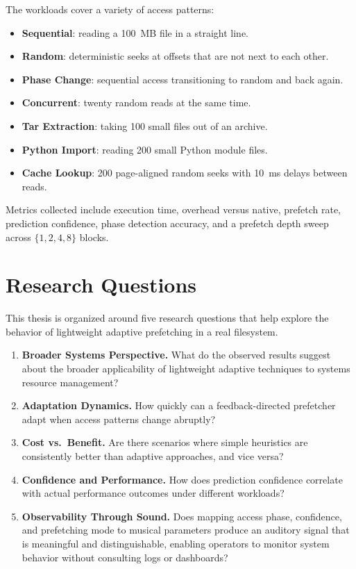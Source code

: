\documentclass[12pt]{report}
\begin{document}
The workloads cover a variety of access patterns:

\begin{itemize}
    \item \textbf{Sequential}: reading a 100~MB file in a straight line.
    \item \textbf{Random}: deterministic seeks at offsets that are not next
    to each other.
    \item \textbf{Phase Change}: sequential access transitioning to random
    and back again.
    \item \textbf{Concurrent}: twenty random reads at the same time.
    \item \textbf{Tar Extraction}: taking 100 small files out of an archive.
    \item \textbf{Python Import}: reading 200 small Python module files.
    \item \textbf{Cache Lookup}: 200 page-aligned random seeks with 10~ms
    delays between reads.
\end{itemize}

Metrics collected include execution time, overhead versus native, prefetch
rate, prediction confidence, phase detection accuracy, and a prefetch depth
sweep across $\{1, 2, 4, 8\}$ blocks.

\section{Research Questions}

This thesis is organized around five research questions that help explore
the behavior of lightweight adaptive prefetching in a real filesystem.

\begin{enumerate}

    \item \textbf{Broader Systems Perspective.} What do the observed results
    suggest about the broader applicability of lightweight adaptive techniques
    to systems resource management?

    \item \textbf{Adaptation Dynamics.} How quickly can a feedback-directed
    prefetcher adapt when access patterns change abruptly?

    \item \textbf{Cost vs.\ Benefit.} Are there scenarios where simple
    heuristics are consistently better than adaptive approaches, and vice
    versa?

    \item \textbf{Confidence and Performance.} How does prediction confidence
    correlate with actual performance outcomes under different workloads?

    \item \textbf{Observability Through Sound.} Does mapping access phase,
    confidence, and prefetching mode to musical parameters produce an auditory
    signal that is meaningful and distinguishable,
    enabling operators to monitor system behavior without consulting logs or
    dashboards?

\end{enumerate}
\end{document}
